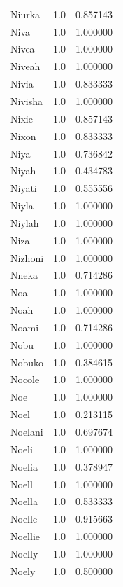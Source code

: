 \documentclass[
  letterpaper,
  DIV=11,
  numbers=noendperiod]{scrreprt}
\begin{document}
\begin{tabular}{lrr}
Niurka          &   1.0 &   0.857143 \\
Niva            &   1.0 &   1.000000 \\
Nivea           &   1.0 &   1.000000 \\
Niveah          &   1.0 &   1.000000 \\
Nivia           &   1.0 &   0.833333 \\
Nivisha         &   1.0 &   1.000000 \\
Nixie           &   1.0 &   0.857143 \\
Nixon           &   1.0 &   0.833333 \\
Niya            &   1.0 &   0.736842 \\
Niyah           &   1.0 &   0.434783 \\
Niyati          &   1.0 &   0.555556 \\
Niyla           &   1.0 &   1.000000 \\
Niylah          &   1.0 &   1.000000 \\
Niza            &   1.0 &   1.000000 \\
Nizhoni         &   1.0 &   1.000000 \\
Nneka           &   1.0 &   0.714286 \\
Noa             &   1.0 &   1.000000 \\
Noah            &   1.0 &   1.000000 \\
Noami           &   1.0 &   0.714286 \\
Nobu            &   1.0 &   1.000000 \\
Nobuko          &   1.0 &   0.384615 \\
Nocole          &   1.0 &   1.000000 \\
Noe             &   1.0 &   1.000000 \\
Noel            &   1.0 &   0.213115 \\
Noelani         &   1.0 &   0.697674 \\
Noeli           &   1.0 &   1.000000 \\
Noelia          &   1.0 &   0.378947 \\
Noell           &   1.0 &   1.000000 \\
Noella          &   1.0 &   0.533333 \\
Noelle          &   1.0 &   0.915663 \\
Noellie         &   1.0 &   1.000000 \\
Noelly          &   1.0 &   1.000000 \\
Noely           &   1.0 &   0.500000 \\

\end{tabular}
\end{document}
